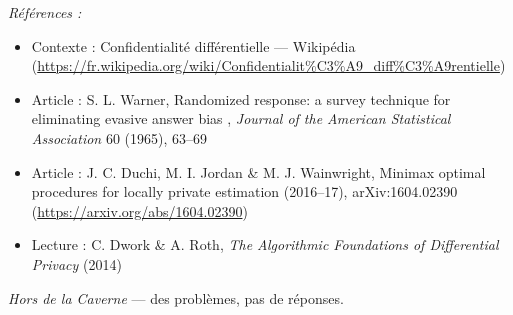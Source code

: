 \documentclass[11pt]{article}
\newenvironment{refs}{\par\small\noindent\emph{Références :}\begin{itemize}\setlength\itemsep{0pt}}{\end{itemize}\normalsize}
\begin{document}
\begin{refs}
\item Contexte : Confidentialité différentielle --- Wikipédia (\url{https://fr.wikipedia.org/wiki/Confidentialit%C3%A9_diff%C3%A9rentielle})
\item Article : S. L. Warner, \og{} Randomized response: a survey technique for eliminating evasive answer bias \fg{}, \textit{Journal of the American Statistical Association} 60 (1965), 63--69
\item Article : J. C. Duchi, M. I. Jordan \& M. J. Wainwright, \og{} Minimax optimal procedures for locally private estimation \fg{} (2016--17), arXiv:1604.02390 (\url{https://arxiv.org/abs/1604.02390})
\item Lecture : C. Dwork \& A. Roth, \textit{The Algorithmic Foundations of Differential Privacy} (2014)
\end{refs}

\bigskip


\vfill
\noindent\emph{Hors de la Caverne} --- des probl\`emes, pas de r\'eponses.
\end{document}
